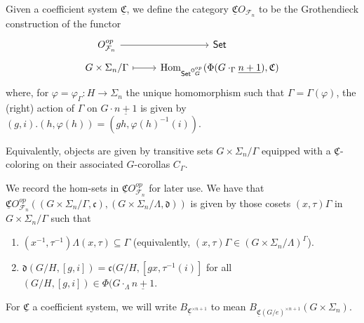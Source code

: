 \documentclass[a4paper,10pt
,draft
]{article}%
\renewcommand{\phi}{\varphi}
\newcommand{\UC}{\underline{\mathfrak C}}
\renewcommand{\F}{\mathcal F}
\renewcommand{\1}{\ensuremath{\mathbb{id}}}
\begin{document}


\begin{definition}
      Given a coefficient system $\UC$, we define the category $\UC O_{\F_n}$ to be the Grothendieck construction of the functor
      \begin{equation}
            \begin{tikzcd}[row sep = tiny]
                  O_{\F_n}^{op} \arrow[r]
                  &
                  \Set
                  \\
                  G \times \Sigma_n / \Gamma \arrow[r, mapsto]
                  &
                  \Hom_{\Set^{\mathsf O_G^{op}}}(\Phi(G \cdot_\Gamma \underline{n+1}), \mathfrak C)
            \end{tikzcd}
      \end{equation}
      where, for $\phi = \phi_\Gamma: H \to \Sigma_n$ the unique homomorphism such that $\Gamma = \Gamma(\phi)$,
      the (right) action of $\Gamma$ on $G \cdot \underline{n+1}$ is given by
      $(g,i).(h,\phi(h)) = (gh, \phi(h)^{-1}(i))$.
\end{definition}

Equivalently, objects are given by transitive sets $G \times \Sigma_n / \Gamma$
equipped with a $\UC$-coloring on their associated $G$-corollas $C_\Gamma$.

\begin{remark}
      We record the hom-sets in $\UC O_{\F_n}^{op}$ for later use. We have that
      \mbox{$\UC O_{\F_n}^{op}((G \times \Sigma_n/\Gamma, \mathfrak c), (G \times \Sigma_n / \Lambda, \mathfrak d))$}
      is given by those cosets $(x,\tau)\Gamma$ in $G \times \Sigma_n / \Gamma$ such that
      \begin{enumerate}
      \item $(x^{-1},\tau^{-1})\Lambda(x,\tau) \subseteq \Gamma$
            (equivalently, $(x,\tau)\Gamma \in (G \times \Sigma_n/\Lambda)^\Gamma$).
      \item $\mathfrak d(G/H, [g,i]) = \mathfrak c(G/H, [g x, \tau^{-1}(i)]$
            for all $(G/H, [g,i]) \in \Phi(G \cdot_{\Lambda} \underline{n+1}$.
      \end{enumerate}
\end{remark}

\begin{notation}
      For $\UC$ a coefficient system, we will write $B_{\UC^{\times n+1}}$ to mean
      $B_{\UC(G/e)^{\times n+1}}(G \times \Sigma_n)$.
\end{notation}
\end{document}
